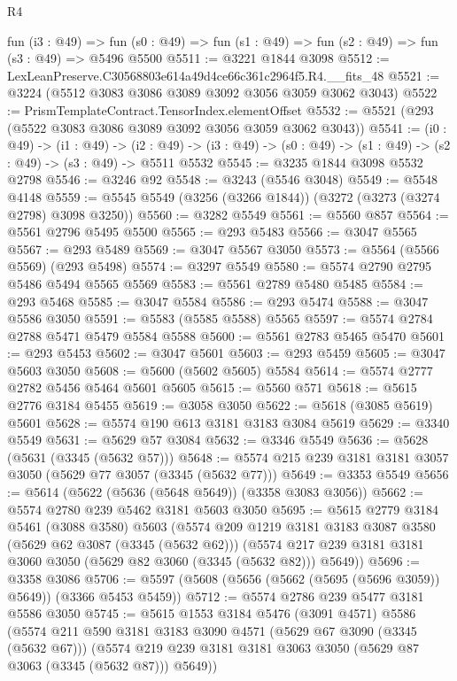 \begin{lexlean}{R4}
\begin{coremodule}
  fun (i3 : @49) =>
  fun (s0 : @49) => fun (s1 : @49) => fun (s2 : @49) => fun (s3 : @49) => @5496 @5500
@5511 := @3221 @1844 @3098
@5512 := LexLeanPreserve.C30568803e614a49d4ce66c361c2964f5.R4.__fits_48
@5521 := @3224 (@5512 @3083 @3086 @3089 @3092 @3056 @3059 @3062 @3043)
@5522 := PrismTemplateContract.TensorIndex.elementOffset
@5532 := @5521 (@293 (@5522 @3083 @3086 @3089 @3092 @3056 @3059 @3062 @3043))
@5541 := (i0 : @49) ->
  (i1 : @49) ->
  (i2 : @49) -> (i3 : @49) -> (s0 : @49) -> (s1 : @49) -> (s2 : @49) -> (s3 : @49) -> @5511 @5532
@5545 := @3235 @1844 @3098 @5532 @2798
@5546 := @3246 @92
@5548 := @3243 (@5546 @3048)
@5549 := @5548 @4148
@5559 := @5545 @5549 (@3256 (@3266 @1844)) (@3272 (@3273 (@3274 @2798) @3098 @3250))
@5560 := @3282 @5549
@5561 := @5560 @857
@5564 := @5561 @2796 @5495 @5500
@5565 := @293 @5483
@5566 := @3047 @5565
@5567 := @293 @5489
@5569 := @3047 @5567 @3050
@5573 := @5564 (@5566 @5569) (@293 @5498)
@5574 := @3297 @5549
@5580 := @5574 @2790 @2795 @5486 @5494 @5565 @5569
@5583 := @5561 @2789 @5480 @5485
@5584 := @293 @5468
@5585 := @3047 @5584
@5586 := @293 @5474
@5588 := @3047 @5586 @3050
@5591 := @5583 (@5585 @5588) @5565
@5597 := @5574 @2784 @2788 @5471 @5479 @5584 @5588
@5600 := @5561 @2783 @5465 @5470
@5601 := @293 @5453
@5602 := @3047 @5601
@5603 := @293 @5459
@5605 := @3047 @5603 @3050
@5608 := @5600 (@5602 @5605) @5584
@5614 := @5574 @2777 @2782 @5456 @5464 @5601 @5605
@5615 := @5560 @571
@5618 := @5615 @2776 @3184 @5455
@5619 := @3058 @3050
@5622 := @5618 (@3085 @5619) @5601
@5628 := @5574 @190 @613 @3181 @3183 @3084 @5619
@5629 := @3340 @5549
@5631 := @5629 @57 @3084
@5632 := @3346 @5549
@5636 := @5628 (@5631 (@3345 (@5632 @57)))
@5648 := @5574 @215 @239 @3181 @3181 @3057 @3050 (@5629 @77 @3057 (@3345 (@5632 @77)))
@5649 := @3353 @5549
@5656 := @5614 (@5622 (@5636 (@5648 @5649)) (@3358 @3083 @3056))
@5662 := @5574 @2780 @239 @5462 @3181 @5603 @3050
@5695 := @5615
    @2779
    @3184
    @5461
    (@3088 @3580)
    @5603
    (@5574
      @209
      @1219
      @3181
      @3183
      @3087
      @3580
      (@5629 @62 @3087 (@3345 (@5632 @62)))
      (@5574 @217 @239 @3181 @3181 @3060 @3050 (@5629 @82 @3060 (@3345 (@5632 @82))) @5649))
@5696 := @3358 @3086
@5706 := @5597 (@5608 (@5656 (@5662 (@5695 (@5696 @3059)) @5649)) (@3366 @5453 @5459))
@5712 := @5574 @2786 @239 @5477 @3181 @5586 @3050
@5745 := @5615
    @1553
    @3184
    @5476
    (@3091 @4571)
    @5586
    (@5574
      @211
      @590
      @3181
      @3183
      @3090
      @4571
      (@5629 @67 @3090 (@3345 (@5632 @67)))
      (@5574 @219 @239 @3181 @3181 @3063 @3050 (@5629 @87 @3063 (@3345 (@5632 @87))) @5649))

\end{coremodule}
\end{lexlean}
